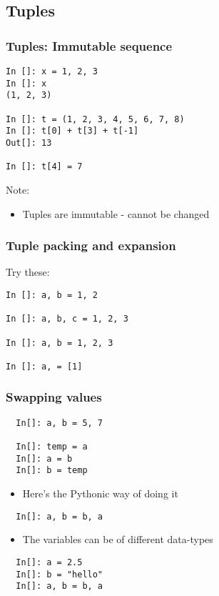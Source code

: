 \documentclass[14pt,compress]{beamer}
\begin{document}
\subsection{Tuples}
\begin{frame}[fragile]
\frametitle{Tuples: Immutable sequence}
\begin{lstlisting}
In []: x = 1, 2, 3
In []: x
(1, 2, 3)

In []: t = (1, 2, 3, 4, 5, 6, 7, 8)
In []: t[0] + t[3] + t[-1]
Out[]: 13

In []: t[4] = 7
\end{lstlisting}
\pause
\begin{block}{Note:}
\begin{itemize}
  \item Tuples are immutable - cannot be changed
\end{itemize}
\end{block}

\end{frame}

\begin{frame}[fragile]
  \frametitle{Tuple packing and expansion}
  Try these:
\begin{lstlisting}
In []: a, b = 1, 2

In []: a, b, c = 1, 2, 3

In []: a, b = 1, 2, 3

In []: a, = [1]
\end{lstlisting}
\end{frame}

\begin{frame}[fragile]
  \frametitle{Swapping values}
  \vspace*{-1em}
  \begin{lstlisting}
  In[]: a, b = 5, 7

  In[]: temp = a
  In[]: a = b
  In[]: b = temp
  \end{lstlisting}
  \begin{itemize}
  \item Here's the Pythonic way of doing it
  \end{itemize}
  \begin{lstlisting}
  In[]: a, b = b, a
  \end{lstlisting}
  \begin{itemize}
  \item The variables can be of different data-types
  \end{itemize}
  \begin{lstlisting}
  In[]: a = 2.5
  In[]: b = "hello"
  In[]: a, b = b, a
\end{lstlisting}
\end{frame}
\end{document}
